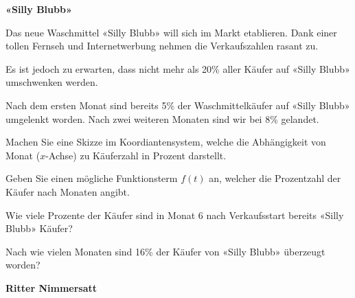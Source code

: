 \bbwActAufgabenNr{} \textbf{«Silly Blubb»}

Das neue Waschmittel «Silly Blubb» will sich im Markt etablieren.
Dank einer tollen Fernseh und Internetwerbung nehmen die
Verkaufszahlen rasant zu.

Es ist jedoch zu erwarten, dass nicht mehr als 20\% aller Käufer auf
«Silly Blubb» umschwenken werden.

Nach dem ersten Monat sind bereits 5\% der Waschmittelkäufer auf
«Silly Blubb» umgelenkt worden. Nach zwei weiteren Monaten sind wir
bei 8\% gelandet.


\begin{bbwAufgabenBlock}
\item Machen Sie eine Skizze im Koordiantensystem, welche die
Abhängigkeit von Monat ($x$-Achse) zu Käuferzahl in Prozent darstellt.


\item Geben Sie einen mögliche Funktionsterm $f(t)$ an, welcher die
Prozentzahl der Käufer nach Monaten angibt.


\item Wie viele Prozente der Käufer sind in Monat 6 nach Verkaufsstart
  bereits «Silly Blubb» Käufer?
  

\item Nach wie vielen Monaten sind 16\% der Käufer von «Silly Blubb»
  überzeugt worden?


\end{bbwAufgabenBlock}


\platzFuerBerechnungenBisEndeSeite{}



\bbwActAufgabenNr{} \textbf{Ritter Nimmersatt}

\nextBbwAufgabenNummer{}


